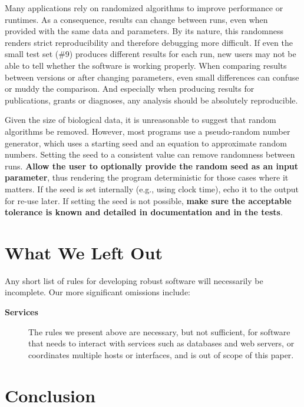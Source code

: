 \documentclass[10pt,letterpaper]{article}
\begin{document}
Many applications rely on randomized algorithms to
improve performance or runtimes. As a consequence, results can change
between runs, even when provided with the same data and parameters. By
its nature, this randomness renders strict reproducibility and therefore
debugging more difficult. If even the small test set (\#9) produces
different results for each run, new users may not be able to tell whether the software is
working properly. When comparing
results between versions or after changing parameters, even small
differences can confuse or muddy the comparison. And especially when
producing results for publications, grants or diagnoses, any analysis
should be absolutely reproducible.

Given the size of biological data, it is unreasonable to suggest that
random algorithms be removed. However, most programs use a pseudo-random
number generator, which uses a starting seed and an equation to
approximate random numbers. Setting the seed to a consistent value
can remove randomness between runs. \textbf{Allow the user to optionally provide
the random seed as an input parameter}, thus rendering the program deterministic
for those cases where it matters. If the seed is set internally (e.g.,
using clock time), echo it to the output for re-use later. 
If setting the seed is not possible, \textbf{make sure the acceptable tolerance is
known and detailed in documentation and in the tests}.

\section*{What We Left Out}

Any short list of rules for developing robust software will
necessarily be incomplete.   Our more significant omissions
include:

\begin{description}



\item[\textbf{Services}] The rules we present above are necessary, but
  not sufficient, for software that needs to interact with services
  such as databases and web servers, or coordinates multiple hosts or interfaces, 
  and is out of scope of this paper.

\end{description}

\section*{Conclusion}
\end{document}
